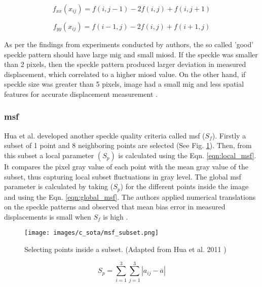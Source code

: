         \begin{equation}
            f_{xx}(x_{ij}) = f(i,j-1) - 2f(i,j) +f(i,j+1)
        \end{equation}

        \begin{equation}
            f_{yy}(x_{ij}) = f(i-1,j) - 2f(i,j) + f(i+1,j)
        \end{equation}

        \noindent As per the findings from experiments conducted by authors, the so called 'good' speckle pattern should have large \gls{mig} and small \gls{miosd}. If the speckle was smaller than 2 pixels, then the speckle pattern produced larger deviation in measured displacement, which correlated to a higher \gls{miosd} value. On the other hand, if speckle size was greater than 5 pixels, image had a small \gls{mig} and less spatial features for accurate displacement measurement \cite{yu_miosd}.

    \subsubsection{\gls{msf}}
        Hua et al. developed another speckle quality criteria called \gls{msf} ($S_f$). Firstly a subset of 1 point and 8 neighboring points are selected (See Fig. \ref{fig:msf_subset.png}). Then, from this subset a local parameter $(S_p)$ is calculated using the Eqn. \ref{eqn:local_msf}. It compares the pixel gray value of each point with the mean gray value of the subset, thus capturing local subset fluctuations in gray level. The global \gls{msf} parameter is calculated by taking ($S_p$) for the different points inside the image and using the Eqn. \ref{eqn:global_msf}. The authors applied numerical translations on the speckle patterns and observed that mean bias error in measured displacements is small when $S_f$ is high \cite{hua_msf}.

        \begin{figure}[h]
            \centering
            \texttt{[image: images/c\_sota/msf\_subset.png]}
            \caption{Selecting points inside a subset. (Adapted from Hua et al. 2011 \cite{hua_msf})}
            \label{fig:msf_subset.png}
        \end{figure}        
        
        \begin{equation}
            S_p = \sum_{i=1}^{3} \sum_{j=1}^{3} |a_{ij} - \overline{a}|
            \label{eqn:local_msf}
        \end{equation}


